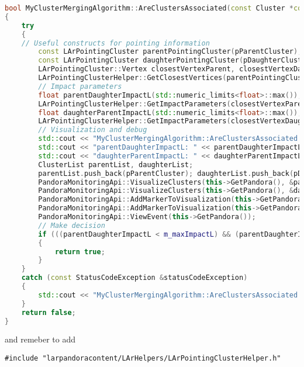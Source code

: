 \begin{lstlisting}[language=C++]
bool MyClusterMergingAlgorithm::AreClustersAssociated(const Cluster *const pParentCluster, const Cluster *const pDaughterCluster) const
{
	try
	{
	// Useful constructs for pointing information
		const LArPointingCluster parentPointingCluster(pParentCluster);
		const LArPointingCluster daughterPointingCluster(pDaughterCluster);
		LArPointingCluster::Vertex closestVertexParent, closestVertexDaughter;
		LArPointingClusterHelper::GetClosestVertices(parentPointingCluster, daughterPointingCluster, closestVertexParent, closestVertexDaughter);
		// Impact parameters
		float parentDaughterImpactL(std::numeric_limits<float>::max()), parentDaughterImpactT(std::numeric_limits<float>::max());
		LArPointingClusterHelper::GetImpactParameters(closestVertexParent, closestVertexDaughter, parentDaughterImpactL, parentDaughterImpactT);
		float daughterParentImpactL(std::numeric_limits<float>::max()), daughterParentImpactT(std::numeric_limits<float>::max());
		LArPointingClusterHelper::GetImpactParameters(closestVertexDaughter, closestVertexParent, daughterParentImpactL, daughterParentImpactT);
		// Visualization and debug
		std::cout << "MyClusterMergingAlgorithm::AreClustersAssociated " << std::endl;
		std::cout << "parentDaughterImpactL: " << parentDaughterImpactL << ", parentDaughterImpactT " << parentDaughterImpactT << std::endl;
		std::cout << "daughterParentImpactL: " << daughterParentImpactL << ", daughterParentImpactT " << daughterParentImpactT << std::endl;
		ClusterList parentList, daughterList;
		parentList.push_back(pParentCluster); daughterList.push_back(pDaughterCluster);
		PandoraMonitoringApi::VisualizeClusters(this->GetPandora(), &parentList, "ParentCluster", RED);
		PandoraMonitoringApi::VisualizeClusters(this->GetPandora(), &daughterList, "DaughterCluster", BLUE);
		PandoraMonitoringApi::AddMarkerToVisualization(this->GetPandora(), &(closestVertexParent.GetPosition()), "ParentVertex", ORANGE, 2);
		PandoraMonitoringApi::AddMarkerToVisualization(this->GetPandora(), &(closestVertexDaughter.GetPosition()), "DaughterVertex", GREEN, 2);
		PandoraMonitoringApi::ViewEvent(this->GetPandora());
		// Make decision
		if (((parentDaughterImpactL < m_maxImpactL) && (parentDaughterImpactT < m_maxImpactT)) || ((daughterParentImpactL < m_maxImpactL) && (daughterParentImpactT < m_maxImpactT)))
		{
			return true;
		}
	}
	catch (const StatusCodeException &statusCodeException)
	{
		std::cout << "MyClusterMergingAlgorithm::AreClustersAssociated " << statusCodeException.ToString() << std::endl;
	}
	return false;
}
\end{lstlisting}

and remeber to add

\begin{lstlisting}
#include "larpandoracontent/LArHelpers/LArPointingClusterHelper.h"
\end{lstlisting}



